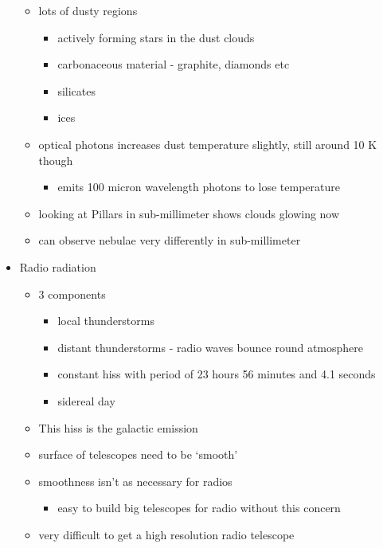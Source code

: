 \documentclass[a4paper,11pt,normalem]{article}
\begin{document}
\begin{itemize}
\begin{itemize}
            \item lots of dusty regions
                \begin{itemize}
                    \item actively forming stars in the dust clouds
                    \item carbonaceous material - graphite, diamonds etc
                    \item silicates
                    \item ices
                \end{itemize}
            \item optical photons increases dust temperature slightly, still around 10 K though
                \begin{itemize}
                    \item emits 100 micron wavelength photons to lose temperature
                \end{itemize}
            \item looking at Pillars in sub-millimeter shows clouds glowing now
            \item can observe nebulae very differently in sub-millimeter
        \end{itemize}
    \item Radio radiation
        \begin{itemize}
            \item 3 components
                \begin{itemize}
                    \item local thunderstorms
                    \item distant thunderstorms - radio waves bounce round atmosphere
                    \item constant hiss with period of 23 hours 56 minutes and 4.1 seconds
                    \item sidereal day
                \end{itemize}
            \item This hiss is the galactic emission
            \item surface of telescopes need to be `smooth'
            \item smoothness isn't as necessary for radios
                \begin{itemize}
                    \item easy to build big telescopes for radio without this concern
                \end{itemize}
            \item very difficult to get a high resolution radio telescope
        \end{itemize}
\end{itemize}
\end{document}

